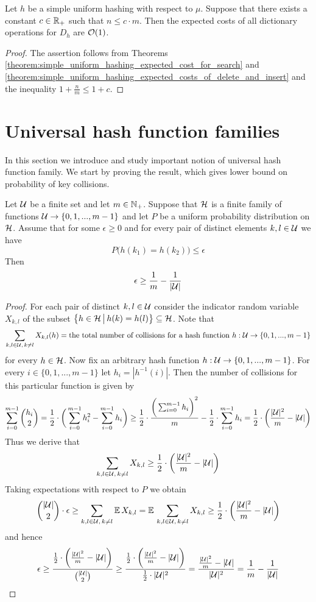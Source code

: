 \begin{corollary}\label{corollary:constant_expected_costs_of_dictionary_operations_for_simple_uniform_hashing}
Let $h$ be a simple uniform hashing with respect to $\mu$. Suppose that there exists a constant $c\in {\mathbb R}_+$ such that $n\leq c\cdot m$. Then the expected costs of all dictionary operations for $D_h$ are ${\mathcal O}(1)$.
\end{corollary}
\begin{proof}
The assertion follows from Theorems \ref{theorem:simple_uniform_hashing_expected_cost_for_search} and \ref{theorem:simple_uniform_hashing_expected_costs_of_delete_and_insert} and the inequality $1 + \frac{n}{m} \leq 1 + c$.
\end{proof}

\section{Universal hash function families}
\noindent
In this section we introduce and study important notion of universal hash function family. We start by proving the result, which gives lower bound on probability of key collisions.

\begin{proposition}\label{proposition:universal_families_of_hash_functions_are_optimal}
Let ${\mathcal U}$ be a finite set and let $m\in {\mathbb N}_+$. Suppose that ${\mathcal H}$ is a finite family of functions ${\mathcal U}\rightarrow \{0,1,...,m-1\}$ and let $P$ be a uniform probability distribution on ${\mathcal H}$. Assume that for some $\epsilon \geq 0$ and for every pair of distinct elements $k,l\in {\mathcal U}$ we have
$$P\big(h(k_1) = h(k_2)\big) \leq \epsilon$$
Then
$$\epsilon \geq \frac{1}{m} - \frac{1}{|{\mathcal U}|}$$
\end{proposition}
\begin{proof}
For each pair of distinct $k,l\in {\mathcal U}$ consider the indicator random variable $X_{k,l}$ of the subset $\big\{h\in {\mathcal H}\,\big|\,h(k) = h(l)\big\}\subseteq {\mathcal H}$. Note that
$$\sum_{k,l\in {\mathcal U},\,k\neq l}X_{k,l}(h) = \mbox{the total number of collisions for a hash function $h:{\mathcal U}\rightarrow \{0,1,...,m-1\}$}$$ 
for every $h\in {\mathcal H}$. Now fix an arbitrary hash function $h:{\mathcal U}\rightarrow \{0,1,...,m-1\}$. For every $i\in \{0,1,...,m-1\}$ let $h_i = |h^{-1}(i)|$. Then the number of collisions for this particular function is given by
$$\sum_{i=0}^{m-1}{{h_i}\choose{2}} = \frac{1}{2}\cdot \bigg(\sum_{i=0}^{m-1}h_i^2 - \sum_{i=0}^{m-1}h_i\bigg) \geq \frac{1}{2}\cdot \frac{\bigg(\sum_{i=0}^{m-1}h_i\bigg)^2}{m} - \frac{1}{2}\cdot \sum_{i=0}^{m-1}h_i = \frac{1}{2}\cdot \bigg(\frac{|{\mathcal U}|^2}{m} - |{\mathcal U}|\bigg)$$
Thus we derive that
$$\sum_{k,l\in {\mathcal U},\,k\neq l}X_{k,l} \geq \frac{1}{2}\cdot \bigg(\frac{|{\mathcal U}|^2}{m} - |{\mathcal U}|\bigg)$$
Taking expectations with respect to $P$ we obtain
$${{|{\mathcal U}|}\choose{2}}\cdot \epsilon \geq \sum_{k,l\in {\mathcal U},\,k\neq l}\mathbb{E}\,X_{k,l} = \mathbb{E}\,\sum_{k,l\in {\mathcal U},\,k\neq l}X_{k,l} \geq \frac{1}{2}\cdot \bigg(\frac{|{\mathcal U}|^2}{m} - |{\mathcal U}|\bigg)$$
and hence
$$\epsilon \geq \frac{\frac{1}{2}\cdot \bigg(\frac{|{\mathcal U}|^2}{m} - |{\mathcal U}|\bigg)}{{{|{\mathcal U}|}\choose{2}}} \geq \frac{\frac{1}{2}\cdot\bigg(\frac{|{\mathcal U}|^2}{m} - |{\mathcal U}|\bigg)}{\frac{1}{2}\cdot |{\mathcal U}|^2} = \frac{\frac{|{\mathcal U}|^2}{m} - |{\mathcal U}|}{|{\mathcal U}|^2} = \frac{1}{m} - \frac{1}{|{\mathcal U}|}$$
\end{proof}


